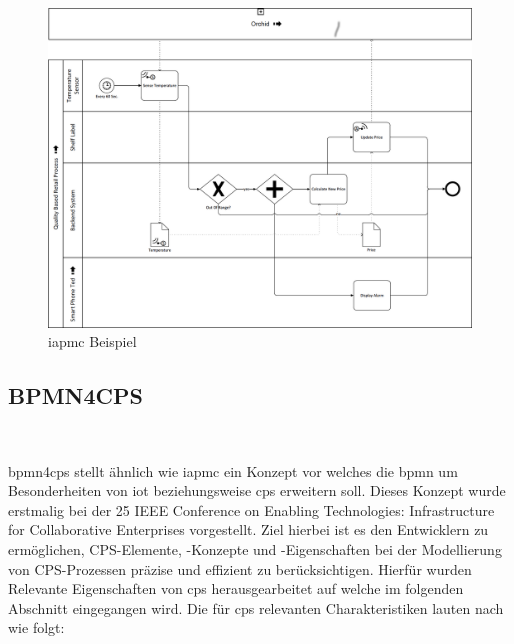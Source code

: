 \documentclass[a4paper, 12pt, twoside, headsepline=true]{scrartcl} %
\begin{document}
\begin{figure}[H]
	\includegraphics[height=11 cm,keepaspectratio,center]{figures/iotaprocess}
	\caption{\ac{iapmc} Beispiel\cite[S.81]{conceptsiotawarepm}}
	\label{fig:iotaprocess}
\end{figure} 

\subsection{BPMN4CPS} 

\ac{bpmn4cps} stellt ähnlich wie \ac{iapmc} ein Konzept vor welches die \ac{bpmn} um Besonderheiten von \ac{iot} beziehungsweise \ac{cps} erweitern soll. Dieses Konzept wurde erstmalig bei der 25 IEEE Conference on Enabling Technologies: Infrastructure for Collaborative Enterprises vorgestellt. Ziel hierbei ist es den Entwicklern zu ermöglichen, CPS-Elemente, -Konzepte und -Eigenschaften bei der Modellierung von CPS-Prozessen präzise und effizient zu berücksichtigen. Hierfür wurden Relevante Eigenschaften von \ac{cps} herausgearbeitet auf welche im folgenden Abschnitt eingegangen wird.
Die für \ac{cps} relevanten Charakteristiken lauten nach \cite{BMPN4CPS} wie folgt:
\end{document}
